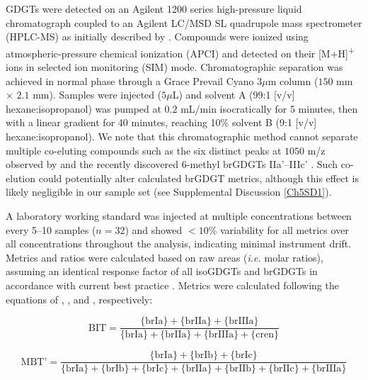 GDGTs were detected on an Agilent 1200 series high-pressure liquid chromatograph coupled to an Agilent LC/MSD SL quadrupole mass spectrometer (HPLC-MS) as initially described by \citet{Hopmans:2000ti}. Compounds were ionized using atmospheric-pressure chemical ionization (APCI) and detected on their [M+H]\textsuperscript{+} ions in selected ion monitoring (SIM) mode. Chromatographic separation was achieved in normal phase through a Grace Prevail Cyano $3 \mu$m column ($150$ mm $\times$ $2.1$ mm). Samples were injected ($5 \mu$L) and solvent A (99:1 [v/v] hexane:isopropanol) was pumped at $0.2$ mL/min isocratically for 5 minutes, then with a linear gradient for 40 minutes, reaching 10\% solvent B (9:1 [v/v] hexane:isopropanol). We note that this chromatographic method cannot separate multiple co-eluting compounds such as the six distinct peaks at $1050$ m/z observed by \citet{Becker:2013jw} and the recently discovered 6-methyl brGDGTs IIa'--IIIc' \citep[see Figure \ref{Ch5Fig:S1} for structures;][]{DeJonge:2013cr,DeJonge:2014kw}. Such co-elution could potentially alter calculated brGDGT metrics, although this effect is likely negligible in our sample set (see Supplemental Discussion \ref{Ch5SD1}).

A laboratory working standard was injected at multiple concentrations between every 5--10 samples ($n = 32$) and showed $<10$\% variability for all metrics over all concentrations throughout the analysis, indicating minimal instrument drift. Metrics and ratios were calculated based on raw areas (\textit{i.e.} molar ratios), assuming an identical response factor of all isoGDGTs and brGDGTs in accordance with current best practice \citep{Schouten:2013hh,Schouten:2013bd}. Metrics were calculated following the equations of \citet{Hopmans:2004kx}, \citet{Peterse:2012bs}, and \citet{Weijers:2007gu}, respectively:

\begin{equation}\label{Ch5Eq:1}
	\text{BIT} = \frac{\{\text{brIa}\} + \{\text{brIIa}\} + \{\text{brIIIa}\}}{\{\text{brIa}\} + \{\text{brIIa}\} + \{\text{brIIIa}\} + \{\text{cren}\}}
\end{equation}

\begin{equation}\label{Ch5Eq:2}
	\text{MBT'} = \frac{\{\text{brIa}\} + \{\text{brIb}\} + \{\text{brIc}\}}{\{\text{brIa}\} + \{\text{brIb}\} + \{\text{brIc}\} + \{\text{brIIa}\} + \{\text{brIIb}\} + \{\text{brIIc}\} + \{\text{brIIIa}\}}
\end{equation}

